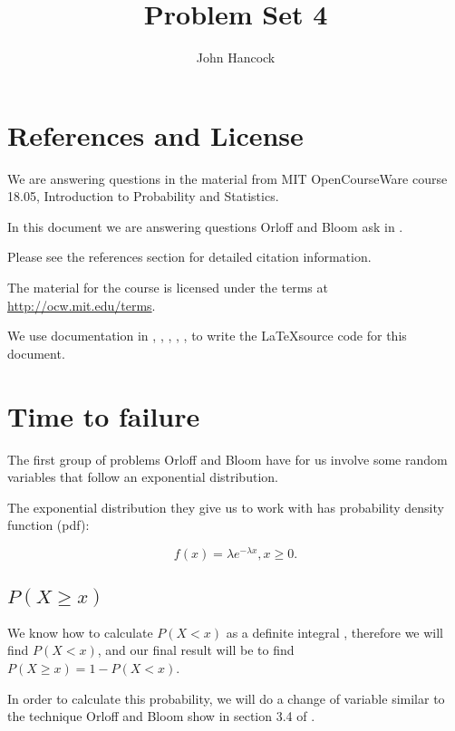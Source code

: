 \documentclass[a5paper,11pt]{article}
\author{John Hancock}
\title{Problem Set 4}
\begin{document}
\maketitle
\tableofcontents
\section{References and License}
We are answering questions in the material from MIT OpenCourseWare
course 18.05, Introduction to Probability and Statistics.

In this document we are answering questions Orloff and Bloom ask in
\cite{slides7}.

Please see the references section for detailed citation information.

The material for the course is licensed under the terms at
\url{http://ocw.mit.edu/terms}.

We use documentation in  \cite{logicNot}, \cite{proofs}, \cite{bars},
\cite{packageClash}, \cite{curlyBrace}, \cite{cases} to write the \LaTeX source code for this document.

\section{Time to failure}
The first group of problems Orloff and Bloom have for us involve some
random variables that follow an exponential distribution.

The exponential distribution they give us to work with has probability
density function (pdf):

\begin{equation}
f\left(x \right) = \lambda e^{-\lambda x}, x \geq 0.
\end{equation}



\subsection{$P\left(X \geq x \right)$}

We know how to calculate $P\left(X < x \right)$ as a definite integral
\cite{reading5b}, therefore we will find 
$P\left( X < x \right)$, and our final result will be to find
$P\left(X \geq x \right) = 1 - P\left( X < x \right)$.

In order to calculate this probability, we will do a change of variable
similar to the technique Orloff and Bloom show in section 3.4 of
\cite{reading7}.
\end{document}
